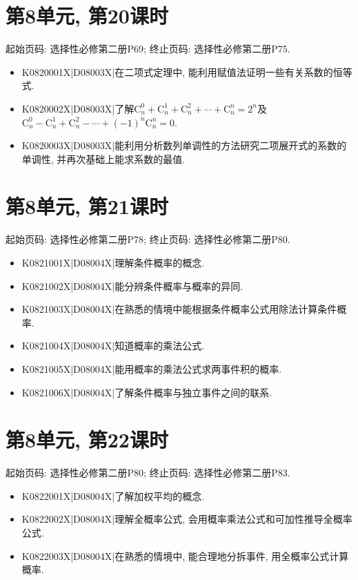 \section*{第8单元, 第20课时}
起始页码: 选择性必修第二册P69; 终止页码: 选择性必修第二册P75.
\begin{itemize}
\item K0820001X|D08003X|在二项式定理中, 能利用赋值法证明一些有关系数的恒等式.
\item K0820002X|D08003X|了解$\mathrm{C}_n^0+\mathrm{C}_n^1+\mathrm{C}_n^2+\cdots+\mathrm{C}_n^n=2^n$及$\mathrm{C}_n^0-\mathrm{C}_n^1+\mathrm{C}_n^2-\cdots+(-1)^n\mathrm{C}_n^n=0$.
\item K0820003X|D08003X|能利用分析数列单调性的方法研究二项展开式的系数的单调性, 并再次基础上能求系数的最值.
\end{itemize}

\section*{第8单元, 第21课时}
起始页码: 选择性必修第二册P78; 终止页码: 选择性必修第二册P80.
\begin{itemize}
\item K0821001X|D08004X|理解条件概率的概念.
\item K0821002X|D08004X|能分辨条件概率与概率的异同.
\item K0821003X|D08004X|在熟悉的情境中能根据条件概率公式用除法计算条件概率.
\item K0821004X|D08004X|知道概率的乘法公式.
\item K0821005X|D08004X|能用概率的乘法公式求两事件积的概率.
\item K0821006X|D08004X|了解条件概率与独立事件之间的联系.
\end{itemize}

\section*{第8单元, 第22课时}
起始页码: 选择性必修第二册P80; 终止页码: 选择性必修第二册P83.
\begin{itemize}
\item K0822001X|D08004X|了解加权平均的概念.
\item K0822002X|D08004X|理解全概率公式, 会用概率乘法公式和可加性推导全概率公式.
\item K0822003X|D08004X|在熟悉的情境中, 能合理地分拆事件, 用全概率公式计算概率.
\end{itemize}

